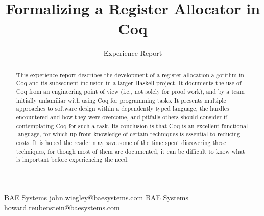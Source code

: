 \documentclass[preprint]{sigplanconf}
\begin{document}
\setlength{\pdfpageheight}{\paperheight}
\setlength{\pdfpagewidth}{\paperwidth}



\exclusivelicense                %



\title{Formalizing a Register Allocator in Coq}
\subtitle{Experience Report}

           {BAE Systems}
           {john.wiegley@baesystems.com}
           {BAE Systems}
           {howard.reubenstein@baesystems.com}

\maketitle

\begin{abstract}
  This experience report describes the development of a register allocation
  algorithm in Coq and its subsequent inclusion in a larger Haskell project.
  It documents the use of Coq from an engineering point of view (i.e., not
  solely for proof work), and by a team initially unfamiliar with using Coq
  for programming tasks. It presents multiple approaches to software design
  within a dependently typed language, the hurdles encountered and how they
  were overcome, and pitfalls others should consider if contemplating Coq for
  such a task. Its conclusion is that Coq is an excellent functional language,
  for which up-front knowledge of certain techniques is essential to reducing
  costs. It is hoped the reader may save some of the time spent discovering
  these techniques, for though most of them are documented, it can be
  difficult to know what is important before experiencing the need.
\end{abstract}
\end{document}
